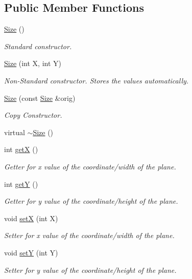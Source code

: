 \subsection*{Public Member Functions}
\begin{DoxyCompactItemize}
\item 
\mbox{\hyperlink{classSize_a05347a96b95d4b93dbe51d159c40c8db}{Size}} ()
\begin{DoxyCompactList}\small\item\em Standard constructor. \end{DoxyCompactList}\item 
\mbox{\hyperlink{classSize_a5786d8c0ac663667879ce1a9663afbd2}{Size}} (int X, int Y)
\begin{DoxyCompactList}\small\item\em Non-\/\+Standard constructor. Stores the values automatically. \end{DoxyCompactList}\item 
\mbox{\hyperlink{classSize_a34fcd67adeb20dfb42150d701060912f}{Size}} (const \mbox{\hyperlink{classSize}{Size}} \&orig)
\begin{DoxyCompactList}\small\item\em Copy Constructor. \end{DoxyCompactList}\item 
virtual \mbox{\hyperlink{classSize_a0d82fe638fc5a83beee67e2cc91d284e}{$\sim$\+Size}} ()
\item 
int \mbox{\hyperlink{classSize_ae9a207666c19954cae4b41174e1bb93d}{getX}} ()
\begin{DoxyCompactList}\small\item\em Getter for x value of the coordinate/width of the plane. \end{DoxyCompactList}\item 
int \mbox{\hyperlink{classSize_aea85ae41eda5b85e61b72b3f9b1b4799}{getY}} ()
\begin{DoxyCompactList}\small\item\em Getter for y value of the coordinate/height of the plane. \end{DoxyCompactList}\item 
void \mbox{\hyperlink{classSize_a555a455ea033f7ec3173c9bda30a896d}{setX}} (int X)
\begin{DoxyCompactList}\small\item\em Setter for x value of the coordinate/width of the plane. \end{DoxyCompactList}\item 
void \mbox{\hyperlink{classSize_a75d2ff298be7d32a4e2d37f05b5f8c92}{setY}} (int Y)
\begin{DoxyCompactList}\small\item\em Setter for y value of the coordinate/height of the plane. \end{DoxyCompactList}\end{DoxyCompactItemize}
